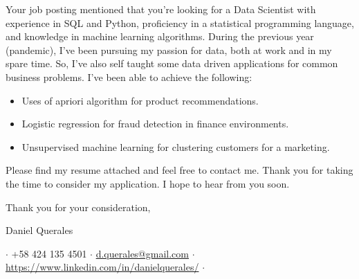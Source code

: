 \documentclass[5pt]{article} %
\def\myname{Daniel Querales}
\begin{document}
Your job posting mentioned that you’re looking for a Data Scientist with experience in SQL and Python, proficiency in a statistical programming language, and knowledge in machine learning algorithms. During the previous year (pandemic), I’ve been pursuing my passion for data, both at work and in my spare time. So, I’ve also self taught some data driven applications for common business problems. I’ve been able to achieve the following:

\begin{itemize}
\item Uses of apriori algorithm for product recommendations.
\item Logistic regression for fraud detection in finance environments.
\item Unsupervised machine learning for clustering customers for a marketing.
\end{itemize}



Please find my resume attached and feel free to contact me. Thank you for taking the time to consider my application. I hope to hear from you soon.

\vspace{1cm}

Thank you for your consideration,
\vspace{2cm}

\myname


\vfill
\centering
$\cdot$
+58 424 135 4501 $\cdot$ %
\href{mailto:d.querales@gmail.com}{d.querales@gmail.com} $\cdot$ %
\url{https://www.linkedin.com/in/danielquerales/} $\cdot$ %
\end{document}
